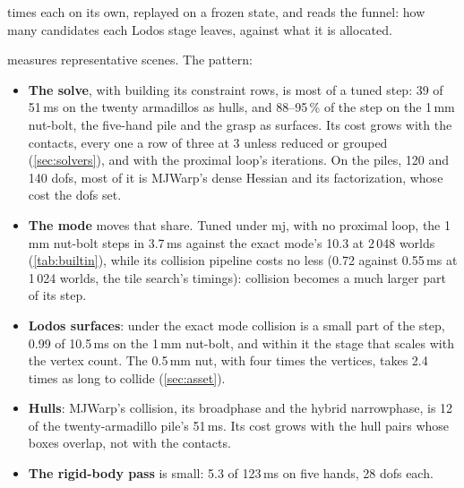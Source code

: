  times each on its own, replayed on a frozen state, and reads the funnel: how many candidates each Lodos stage leaves, against what it is allocated.

\begin{table}[t]
\centering
\caption{Where the time goes: each stage replayed alone on one frozen state of the scene's state set, at its tuned settings and the batch it was tuned at, under the exact mode, ms per step (, 2026-11-04). ``MJWarp coll.'' is the profiler's , ``Lodos coll.'' its three Lodos stages.}
\label{tab:profiles}
\small

\end{table}

 measures representative scenes. The pattern:

\begin{itemize}
\item \textbf{The solve}, with building its constraint rows, is most of a tuned step: 39 of 51\,ms on the twenty armadillos as hulls, and 88--95\,\% of the step on the 1\,mm nut-bolt, the five-hand pile and the grasp as surfaces. Its cost grows with the contacts, every one a row of three at  3 unless reduced or grouped (\cref{sec:solvers}), and with the proximal loop's iterations. On the piles, 120 and 140 dofs, most of it is MJWarp's dense Hessian and its factorization, whose cost the dofs set.
\item \textbf{The mode} moves that share. Tuned under mj, with no proximal loop, the 1\,mm nut-bolt steps in 3.7\,ms against the exact mode's 10.3 at 2\,048 worlds (\cref{tab:builtin}), while its collision pipeline costs no less (0.72 against 0.55\,ms at 1\,024 worlds, the tile search's timings): collision becomes a much larger part of its step.
\item \textbf{Lodos surfaces}: under the exact mode collision is a small part of the step, 0.99 of 10.5\,ms on the 1\,mm nut-bolt, and within it the stage that scales with the vertex count. The 0.5\,mm nut, with four times the vertices, takes 2.4 times as long to collide (\cref{sec:asset}).
\item \textbf{Hulls}: MJWarp's collision, its broadphase and the hybrid narrowphase, is 12 of the twenty-armadillo pile's 51\,ms. Its cost grows with the hull pairs whose boxes overlap, not with the contacts.
\item \textbf{The rigid-body pass} is small: 5.3 of 123\,ms on five hands, 28 dofs each.
\end{itemize}

